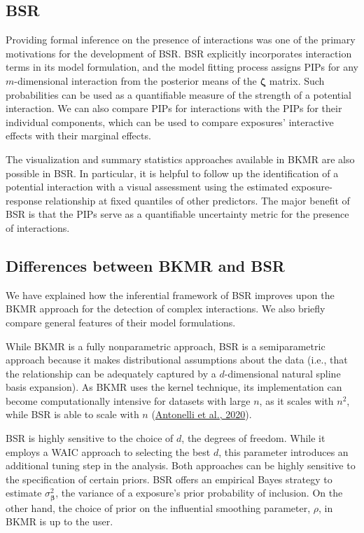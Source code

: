 \documentclass[12pt, twoside]{amherstthesis}
\begin{document}
\hypertarget{bsr-1}{%
\subsection{BSR}\label{bsr-1}}

Providing formal inference on the presence of interactions was one of the primary motivations for the development of BSR. BSR explicitly incorporates interaction terms in its model formulation, and the model fitting process assigns PIPs for any \(m\)-dimensional interaction from the posterior means of the \(\boldsymbol\zeta\) matrix. Such probabilities can be used as a quantifiable measure of the strength of a potential interaction. We can also compare PIPs for interactions with the PIPs for their individual components, which can be used to compare exposures' interactive effects with their marginal effects.

The visualization and summary statistics approaches available in BKMR are also possible in BSR. In particular, it is helpful to follow up the identification of a potential interaction with a visual assessment using the estimated exposure-response relationship at fixed quantiles of other predictors. The major benefit of BSR is that the PIPs serve as a quantifiable uncertainty metric for the presence of interactions.

\hypertarget{differences-between-bkmr-and-bsr}{%
\subsection{Differences between BKMR and BSR}\label{differences-between-bkmr-and-bsr}}

We have explained how the inferential framework of BSR improves upon the BKMR approach for the detection of complex interactions. We also briefly compare general features of their model formulations.

While BKMR is a fully nonparametric approach, BSR is a semiparametric approach because it makes distributional assumptions about the data (i.e., that the relationship can be adequately captured by a \(d\)-dimensional natural spline basis expansion). As BKMR uses the kernel technique, its implementation can become computationally intensive for datasets with large \(n\), as it scales with \(n^2\), while BSR is able to scale with \(n\) (\protect\hyperlink{ref-antonelli_estimating_2020}{Antonelli et al., 2020}).

BSR is highly sensitive to the choice of \(d\), the degrees of freedom. While it employs a WAIC approach to selecting the best \(d\), this parameter introduces an additional tuning step in the analysis. Both approaches can be highly sensitive to the specification of certain priors. BSR offers an empirical Bayes strategy to estimate \(\sigma^2_{\boldsymbol\beta}\), the variance of a exposure's prior probability of inclusion. On the other hand, the choice of prior on the influential smoothing parameter, \(\rho\), in BKMR is up to the user.
\end{document}
